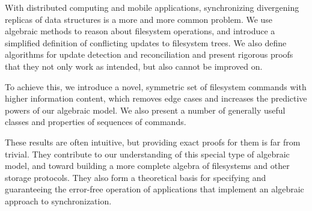 
With distributed computing and mobile applications,
synchronizing divergening replicas of data structures is a more and more common problem.
We use algebraic methods to reason about filesystem operations, 
and introduce a simplified definition of conflicting updates to filesystem trees.
We also define algorithms for update detection and reconciliation
and present rigorous proofs that they not only work as intended,
but also cannot be improved on.

To achieve this, we introduce a novel, symmetric set of filesystem commands
with higher information content,
which removes edge cases
and increases the predictive powers of our algebraic model.
We also present a number of generally useful classes and properties
of sequences of commands.

These results are often intuitive,
but providing exact proofs for them is far from trivial.
They contribute to our understanding of this special type of algebraic model,
and toward building a more complete algebra
of filesystems and other storage protocols.
They also form a theoretical basis for
specifying
and guaranteeing the error-free operation
of applications that implement an algebraic approach to synchronization.
